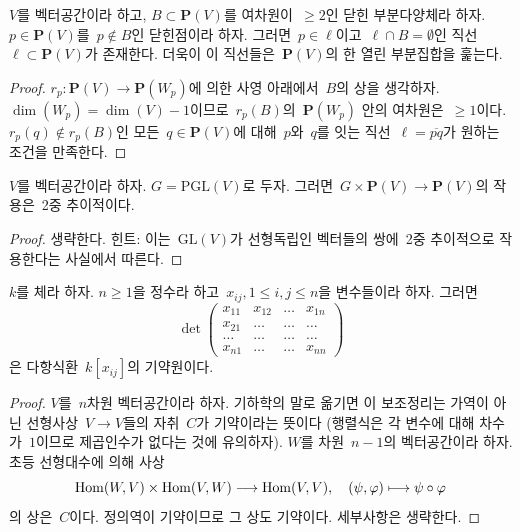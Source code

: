 \begin{lemma}
\label{lemma-find-lines}
$V$를 벡터공간이라 하고, $B \subset \mathbf{P}(V)$를 여차원이\ 
$\geq 2$인 닫힌 부분다양체라 하자. $p \in \mathbf{P}(V)$를\ 
$p \not \in B$인 닫힌점이라 하자. 그러면\  $p \in \ell$이고\ 
$\ell \cap B = \emptyset$인 직선\  $\ell \subset \mathbf{P}(V)$가 존재한다.
더욱이 이 직선들은\  $\mathbf{P}(V)$의 한 열린 부분집합을 훑는다.
\end{lemma}

\begin{proof}
$r_p : \mathbf{P}(V) \to \mathbf{P}(W_p)$에 의한 사영 아래에서\  $B$의 상을
생각하자. $\dim(W_p) = \dim(V) - 1$이므로\  $r_p(B)$의\ 
$\mathbf{P}(W_p)$ 안의 여차원은\  $\geq 1$이다.
$r_p(q) \not \in r_p(B)$인 모든\  $q \in \mathbf{P}(V)$에 대해\ 
$p$와\  $q$를 잇는 직선\  $\ell = \overline{pq}$가 원하는 조건을 만족한다.
\end{proof}

\begin{lemma}
\label{lemma-doubly-transitive}
$V$를 벡터공간이라 하자. $G = \text{PGL}(V)$로 두자.
그러면\  $G \times \mathbf{P}(V) \to \mathbf{P}(V)$의 작용은\ 
2중 추이적이다.
\end{lemma}

\begin{proof}
생략한다. 힌트: 이는\  $\text{GL}(V)$가 선형독립인 벡터들의 쌍에\ 
2중 추이적으로 작용한다는 사실에서 따른다.
\end{proof}

\begin{lemma}
\label{lemma-determinant}
$k$를 체라 하자. $n \geq 1$을 정수라 하고\ 
$x_{ij}, 1 \leq i, j \leq n$을 변수들이라 하자. 그러면
$$
\det
\left(
\begin{matrix}
x_{11} & x_{12} & \ldots & x_{1n} \\
x_{21} & \ldots & \ldots & \ldots \\
\ldots & \ldots & \ldots & \ldots \\
x_{n1} & \ldots & \ldots & x_{nn}
\end{matrix}
\right)
$$
은 다항식환\  $k[x_{ij}]$의 기약원이다.
\end{lemma}

\begin{proof}
$V$를\  $n$차원 벡터공간이라 하자. 기하학의 말로 옮기면 이 보조정리는
가역이 아닌 선형사상\  $V \to V$들의 자취\  $C$가 기약이라는 뜻이다
(행렬식은 각 변수에 대해 차수가\  $1$이므로 제곱인수가 없다는 것에
유의하자). $W$를 차원\  $n - 1$의 벡터공간이라 하자.
초등 선형대수에 의해 사상
$$
\mathop{\mathrm{Hom}}\nolimits(W, V) \times \mathop{\mathrm{Hom}}\nolimits(V, W) \longrightarrow \mathop{\mathrm{Hom}}\nolimits(V, V),\quad
(\psi, \varphi) \longmapsto \psi \circ \varphi
$$
의 상은\  $C$이다. 정의역이 기약이므로 그 상도 기약이다.
세부사항은 생략한다.
\end{proof}


